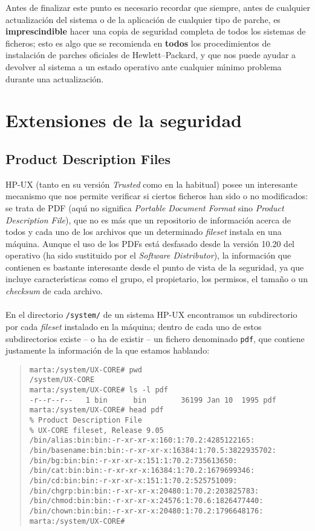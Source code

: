 Antes de finalizar este punto es necesario recordar que siempre, antes de
cualquier actualizaci\'on del sistema o de la aplicaci\'on de cualquier tipo de
parche, es {\bf imprescindible} hacer una copia de seguridad completa de todos
los sistemas de ficheros; esto es algo que se recomienda en {\bf todos} los
procedimientos de instalaci\'on de parches oficiales de Hewlett--Packard, y que
nos puede ayudar a devolver al sistema a un estado operativo ante cualquier
m\'{\i}nimo problema durante una actualizaci\'on.
\section{Extensiones de la seguridad}
\subsection{Product Description Files}
HP-UX (tanto en su versi\'on {\it Trusted} como en la habitual) posee un 
interesante mecanismo que nos permite verificar si ciertos ficheros han 
sido o no modificados: se trata de PDF (aqu\'{\i} no significa {\it Portable
Document Format} sino {\it Product Description File}), que no es m\'as que un
repositorio de informaci\'on acerca de todos y cada uno de los archivos que un
determinado {\it fileset} instala en una m\'aquina. Aunque el uso de los PDFs 
est\'a desfasado desde la versi\'on 10.20 del operativo (ha sido 
sustituido por el {\it Software Distributor}), la informaci\'on que contienen es
bastante interesante desde el punto de vista de la seguridad, ya que incluye
caracter\'{\i}sticas como el grupo, el propietario, los permisos, el tama\~no o
un {\it checksum} de cada archivo.\\
\\En el directorio {\tt /system/} de un sistema HP-UX encontramos un 
subdirectorio por cada {\it fileset} instalado en la m\'aquina; dentro de cada 
uno de estos subdirectorios existe -- o ha de existir -- un fichero denominado 
{\tt pdf}, que contiene justamente la informaci\'on de la que estamos hablando:
\begin{quote}
\begin{verbatim}
marta:/system/UX-CORE# pwd
/system/UX-CORE
marta:/system/UX-CORE# ls -l pdf
-r--r--r--   1 bin      bin        36199 Jan 10  1995 pdf
marta:/system/UX-CORE# head pdf
% Product Description File
% UX-CORE fileset, Release 9.05
/bin/alias:bin:bin:-r-xr-xr-x:160:1:70.2:4285122165:
/bin/basename:bin:bin:-r-xr-xr-x:16384:1:70.5:3822935702:
/bin/bg:bin:bin:-r-xr-xr-x:151:1:70.2:735613650:
/bin/cat:bin:bin:-r-xr-xr-x:16384:1:70.2:1679699346:
/bin/cd:bin:bin:-r-xr-xr-x:151:1:70.2:525751009:
/bin/chgrp:bin:bin:-r-xr-xr-x:20480:1:70.2:203825783:
/bin/chmod:bin:bin:-r-xr-xr-x:24576:1:70.6:1826477440:
/bin/chown:bin:bin:-r-xr-xr-x:20480:1:70.2:1796648176:
marta:/system/UX-CORE# 
\end{verbatim}
\end{quote}
